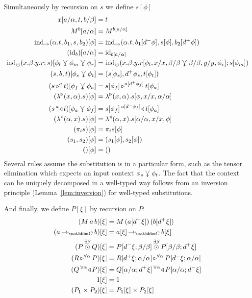 \documentclass{llncs}
\begin{document}
\begin{definition}
  Simultaneously by recursion on $s$ we define $s[\phi]$
  \begin{align*}
    x[a/\alpha,t,b/\beta] &= t\\
    \pendappXtoY M b[a/\alpha] &= \pendappXtoY M {b[a/\alpha]}\\
    {\punitelimkontZatABC {\alpha. t}{b_1} s {b_2}}[\phi] &=
    {\punitelimkontZatABC {\alpha. t}{b_1[d^-\phi]} {s[\phi]} {b_2[d^+\phi]}}\\
    (\punitrefl b)[a/\alpha] &= \punitrefl {b[a/\alpha]}\\
    {\tensorelimWkontZ s {x.\beta.y.r}[\phi_l\jnctx\phi_m\jnctx\phi_r]} &=
    \tensorelimWkontZ {s[\phi_m]} {x.\beta.y. r[\phi_l,x/x,\beta/\beta \jnctx \beta/\beta,y/y,\phi_r]}\\
    {\tensorintroatXwithYandZ b s t}[\phi_s \jnctx \phi_t] &= \tensorintroatXwithYandZ {d^+\phi_s} {s[\phi_s]} {t[\phi_t]}\\
    {(\homrappXtoYatZ s t a)}[\phi_f\jnctx \phi_a] &=
    {\homrappXtoYatZ {s[\phi_f]} {t[\phi_a]} {a[d^+\phi_f]}}\\
    {(\homrlambdaXatYdotZ {x}{\alpha} s)}[\phi] &=
    {\homrlambdaXatYdotZ {x}{\alpha} {s[\phi,x/x,\alpha/\alpha]}}\\
    {(\homlappXtoYatZ t s a)}[\phi_a\jnctx \phi_f] &=
    {\homlappXtoYatZ {t[\phi_a]} {s[\phi_f]} {a[d^-\phi_f]}}\\
    {(\homllambdaXatYdotZ {x}{\alpha} s)}[\phi] &=
    {\homllambdaXatYdotZ {x}{\alpha} {s[\alpha/\alpha,x/x,\phi]}}\\
    (\pi_i s)[\phi] &= \pi_i s[\phi]\\
    (s_1,s_2)[\phi] &= (s_1[\phi], s_2[\phi])\\
    ()[\phi] &= ()
  \end{align*}
  Several rules assume the substitution is in a particular form, such
  as the tensor elimination which expects an input context
  $\phi_s\jnctx\phi_t$. The fact that the context can be uniquely
  decomposed in a well-typed way follows from an inversion principle (Lemma~\ref{lem:inversion})
  for well-typed substitutions.

  And finally, we define $P[\xi]$ by recursion on $P$:
  \begin{align*}
    (M\,a\,b)[\xi] &= M\,(a[d^-\xi])\,(b[d^+\xi])\\
    (\punitinXfromYtoZ {\cat C} a b)[\xi] &= \punitinXfromYtoZ {\cat C} {a[\xi]}{b[\xi]}\\
    (\tensorexistsXwithYandZ \beta P Q)[\xi] &= \tensorexistsXwithYandZ \beta {P[d^-\xi;\beta/\beta]}{P[\beta/\beta;d^+\xi]}\\
    (\homrallXYtoZ \alpha R P)[\xi] &= \homrallXYtoZ \alpha {R[d^+\xi;\alpha/\alpha]} {P[d^-\xi;\alpha/\alpha]}\\
    (\homlallXYtoZ \alpha P Q)[\xi] &= \homlallXYtoZ \alpha {P[\alpha/\alpha;d^-\xi]} {Q[\alpha/\alpha;d^+\xi]}\\
    1[\xi] &= 1\\
    (P_1 \times P_2)[\xi] &= P_1[\xi] \times P_2[\xi]
  \end{align*}
\end{definition}
\end{document}
